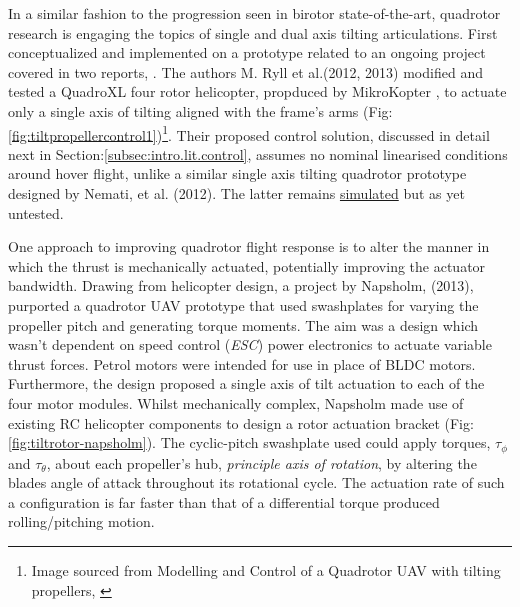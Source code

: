\par
In a similar fashion to the progression seen in birotor state-of-the-art, quadrotor research is engaging the topics of single and dual axis tilting articulations. First conceptualized and implemented on a prototype related to an ongoing project covered in two reports, \cite{tiltpropellercontrol,tiltpropellerflight}. The authors M. Ryll et al.(2012, 2013) modified and tested a QuadroXL four rotor helicopter, propduced by MikroKopter \cite{mikrokopter}, to actuate only a single axis of tilting aligned with the frame's arms (Fig:\ref{fig:tiltpropellercontrol1})\footnote{Image sourced from Modelling and Control of a Quadrotor UAV with tilting propellers, \cite{tiltpropellercontrol}}. Their proposed control solution, discussed in detail next in Section:\ref{subsec:intro.lit.control}, assumes no nominal linearised conditions around hover flight, unlike a similar single axis tilting quadrotor prototype designed by Nemati, et al. (2012)\cite{singleaxistilting}. The latter remains  \underline{simulated} but as yet untested.
\par
One approach to improving quadrotor flight response is to alter the manner in which the thrust is mechanically actuated, potentially improving the actuator bandwidth. Drawing from helicopter design, a project by Napsholm, (2013)\cite{napsholm}, purported a quadrotor UAV prototype that used swashplates for varying the propeller pitch and generating torque moments. The aim was a design which wasn't dependent on speed control (\emph{ESC}) power electronics to actuate variable thrust forces. Petrol motors were intended for use in place of BLDC motors. Furthermore, the design proposed a single axis of tilt actuation to each of the four motor modules. Whilst mechanically complex, Napsholm made use of existing RC helicopter components to design a rotor actuation bracket (Fig:\ref{fig:tiltrotor-napsholm}). The cyclic-pitch swashplate used \cite{autonomousrobotspitch} could apply torques, $\tau_{\phi}$ and $\tau_{\theta}$, about each propeller's hub, \emph{principle axis of rotation}, by altering the blades angle of attack throughout its rotational cycle. The actuation rate of such a configuration is far faster than that of a differential torque produced rolling/pitching motion.

